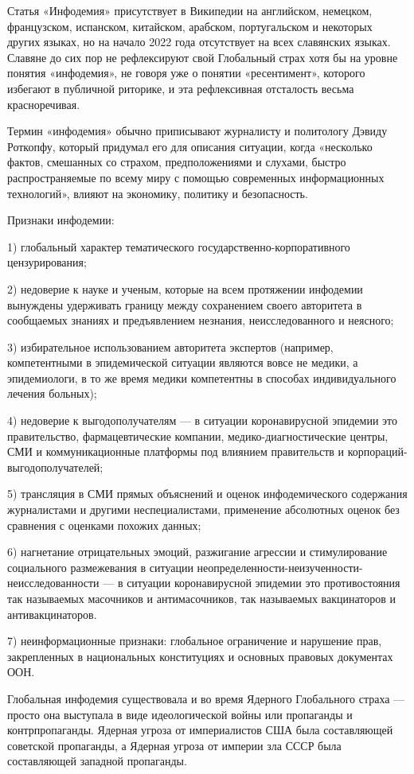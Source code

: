 Статья «Инфодемия» присутствует в Википедии на английском, немецком,
французском, испанском, китайском, арабском, португальском и некоторых других
языках, но на начало 2022 года отсутствует на всех славянских языках. Славяне
до сих пор не рефлексируют свой Глобальный страх хотя бы на уровне понятия
«инфодемия», не говоря уже о понятии «ресентимент», которого избегают в
публичной риторике, и эта рефлексивная отсталость весьма красноречивая.

Термин «инфодемия» обычно приписывают журналисту и политологу Дэвиду Роткопфу,
который придумал его для описания ситуации, когда «несколько фактов, смешанных
со страхом, предположениями и слухами, быстро распространяемые по всему миру с
помощью современных информационных технологий», влияют на экономику, политику и
безопасность.

Признаки инфодемии:

1) глобальный характер тематического государственно-корпоративного
цензурирования;

2) недоверие к науке и ученым, которые на всем протяжении инфодемии вынуждены
удерживать границу между сохранением своего авторитета в сообщаемых знаниях и
предъявлением незнания, неисследованного и неясного;

3) избирательное использованием авторитета экспертов (например, компетентными в
эпидемической ситуации являются вовсе не медики, а эпидемиологи, в то же время
медики компетентны в способах индивидуального лечения больных);

4) недоверие к выгодополучателям — в ситуации коронавирусной эпидемии это
правительство, фармацевтические компании, медико-диагностические центры, СМИ и
коммуникационные платформы под влиянием правительств и
корпораций-выгодополучателей;

5) трансляция в СМИ прямых объяснений и оценок инфодемического содержания
журналистами и другими неспециалистами, применение абсолютных оценок без
сравнения с оценками похожих данных;

6) нагнетание отрицательных эмоций, разжигание агрессии и стимулирование
социального размежевания в ситуации
неопределенности-неизученности-неисследованности — в ситуации коронавирусной
эпидемии это противостояния так называемых масочников и антимасочников, так
называемых вакцинаторов и антивакцинаторов.

7) неинформационные признаки: глобальное ограничение и нарушение прав,
закрепленных в национальных конституциях и основных правовых документах ООН.

Глобальная инфодемия существовала и во время Ядерного Глобального страха —
просто она выступала в виде идеологической войны или пропаганды и
контрпропаганды. Ядерная угроза от империалистов США была составляющей
советской пропаганды, а Ядерная угроза от империи зла СССР была составляющей
западной пропаганды.

